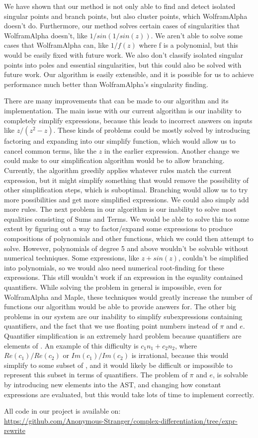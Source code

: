 We have shown that our method is not only able to find and detect isolated singular points and branch points, but also cluster points, which WolframAlpha doesn't do. Furthermore, our method solves certain cases of singularities that WolframAlpha doesn't, like $1/sin(1/sin(z))$. We aren't able to solve some cases that WolframAlpha can, like $1/f(z)$ where f is a polynomial, but this would be easily fixed with future work. We also don't classify isolated singular points into poles and essential singularities, but this could also be solved with future work. Our algorithm is easily extensible, and it is possible for us to achieve performance much better than WolframAlpha's singularity finding.

There are many improvements that can be made to our algorithm and its implementation. The main issue with our current algorithm is our inability to completely simplify expressions, because this leads to incorrect answers on inputs like $z/(z^2-z)$. These kinds of problems could be mostly solved by introducing factoring and expanding into our simplify function, which would allow us to cancel common terms, like the $z$ in the earlier expression. Another change we could make to our simplification algorithm would be to allow branching. Currently, the algorithm greedily applies whatever rules match the current expression, but it might simplify something that would remove the possibility of other simplification steps, which is suboptimal. Branching would allow us to try more possibilities and get more simplified expressions. We could also simply add more rules. The next problem in our algorithm is our inability to solve most equalities consisting of Sums and Terms. We would be able to solve this to some extent by figuring out a way to factor/expand some expressions to produce compositions of polynomials and other functions, which we could then attempt to solve. However, polynomials of degree 5 and above wouldn't be solvable without numerical techniques. Some expressions, like $z+sin(z)$, couldn't be simplified into polynomials, so we would also need numerical root-finding for these expressions. This still wouldn't work if an expression in the equality contained quantifiers. While solving the problem in general is impossible, even for WolframAlpha and Maple, these techniques would greatly increase the number of functions our algorithm would be able to provide answers for. The other big problems in our system are our inability to simplify subexpressions containing quantifiers, and the fact that we use floating point numbers instead of $\pi$ and $e$. Quantifier simplification is an extremely hard problem because quantifiers are elements of \ZZ. An example of this difficulty is $c_1n_1+c_2n_2$, where $Re(c_1)/Re(c_2)$ or $Im(c_1)/Im(c_2)$ is irrational, because this would simplify to some subset of \CC, and it would likely be difficult or impossible to represent this subset in terms of quantifiers. The problem of $\pi$ and $e$, is solvable by introducing new elements into the AST, and changing how constant expressions are evaluated, but this would take lots of time to implement correctly.


All code in our project is available on: \\ \href{https://github.com/Anonymous-Stranger/complex-differentiation/tree/expr-rewrite}{https://github.com/Anonymous-Stranger/complex-differentiation/tree/expr-rewrite}
